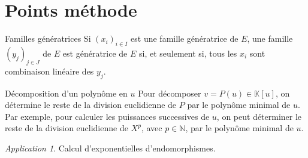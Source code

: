 \documentclass[french]{book}
\newcommand{\N}{\mathbb{N}}
\newcommand{\K}{\mathbb{K}}
\theoremstyle{plain}
\theoremstyle{definition}
\theoremstyle{remark}
\newtheorem*{app}{Application}
\begin{document}
\section{Points méthode}
\begin{PM}{Familles génératrices} Si $(x_i)_{i\in I}$ est une famille génératrice de $E$, une famille $(y_j)_{j\in J}$ de $E$ est génératrice de $E$ si, et seulement si, tous les $x_i$ sont combinaison linéaire des $y_j$.
\end{PM}
\begin{PM}{Décomposition d'un polynôme en $u$} Pour décomposer $v=P(u)\in\K[u]$, on détermine le reste de la division euclidienne de $P$ par le polynôme minimal de $u$. Par exemple, pour calculer les puissances successives de $u$, on peut déterminer le reste de la division euclidienne de $X^p$, avec $p\in\N$, par le polynôme minimal de $u$.
\end{PM}\begin{app}
	Calcul d'exponentielles d'endomorphismes.
\end{app}
\end{document}
